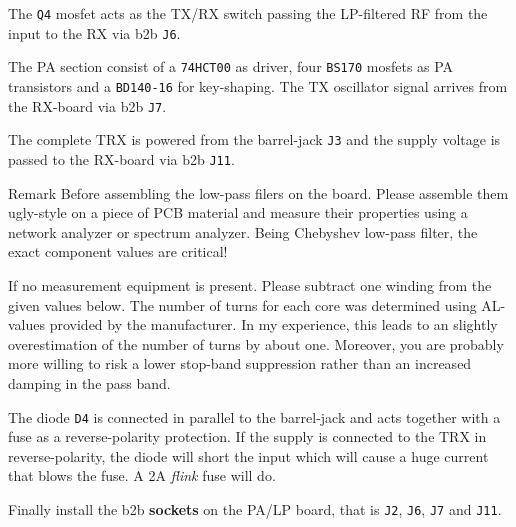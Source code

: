 \documentclass[10pt, a4paper,twoside]{scrartcl}
\newenvironment{remark}{\begin{bclogo}[couleur=blue!30,arrondi=.1,logo=\bcinfo,ombre=true]{Remark}}{\end{bclogo}}
\begin{document}
The \texttt{Q4} mosfet acts as the TX/RX switch passing the LP-filtered RF from the input to the RX via b2b \texttt{J6}.

The PA section consist of a \texttt{74HCT00} as driver, four \texttt{BS170} mosfets as PA transistors and a \texttt{BD140-16} for key-shaping. The TX oscillator signal arrives from the RX-board via b2b \texttt{J7}.

The complete TRX is powered from the barrel-jack \texttt{J3} and the supply voltage is passed to the RX-board via b2b \texttt{J11}. 

\begin{remark}
 Before assembling the low-pass filers on the board. Please assemble them ugly-style on a piece of PCB material and measure their properties using a network analyzer or spectrum analyzer. Being Chebyshev low-pass filter, the exact component values are critical!
\end{remark}

 If no measurement equipment is present. Please subtract one winding from the given values below. The number of turns for each core was determined using AL-values provided by the manufacturer. In my experience, this leads to an slightly overestimation of the number of turns by about one. Moreover, you are probably more willing to risk a lower stop-band suppression rather than an increased damping in the pass band.
 
 The diode \texttt{D4} is connected in parallel to the barrel-jack and acts together with a fuse as a reverse-polarity protection. If the supply is connected to the TRX in reverse-polarity, the diode will short the input which will cause a huge current that blows the fuse. A 2A \emph{flink} fuse will do.
 
 Finally install the b2b \textbf{sockets} on the PA/LP board, that is \texttt{J2}, \texttt{J6}, \texttt{J7} and \texttt{J11}.
 
\clearpage
\end{document}
